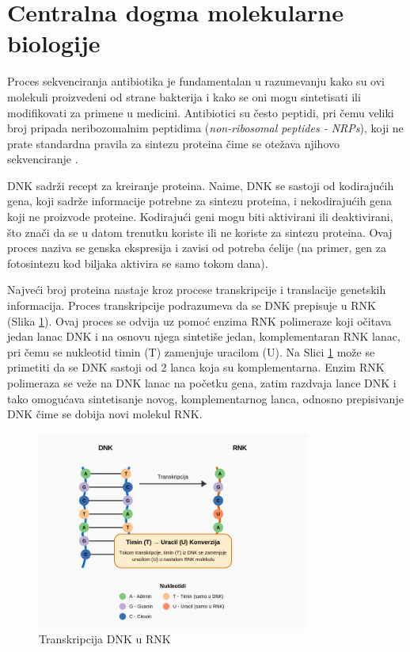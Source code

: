 \documentclass[12pt,oneside]{memoir}
\begin{document}
\section{Centralna dogma molekularne biologije}
Proces sekvenciranja antibiotika je fundamentalan u razumevanju kako su ovi molekuli proizvedeni od strane bakterija i kako se oni mogu sintetisati ili modifikovati za primene u medicini. Antibiotici su često peptidi, pri čemu veliki broj pripada neribozomalnim peptidima (\emph{non-ribosomal peptides - NRPs}), koji ne prate standardna pravila za sintezu proteina čime se otežava njihovo sekvenciranje \cite{online_lecture, online_book}.

DNK sadrži recept za kreiranje proteina. Naime, DNK se sastoji od kodirajućih gena, koji sadrže informacije potrebne za sintezu proteina, i nekodirajućih gena koji ne proizvode proteine. Kodirajući geni mogu biti aktivirani ili deaktivirani, što znači da se u datom trenutku koriste ili ne koriste za sintezu proteina. Ovaj proces naziva se genska ekspresija i zavisi od potreba ćelije (na primer, gen za fotosintezu kod biljaka aktivira se samo tokom dana).

Najveći broj proteina nastaje kroz procese transkripcije i translacije genetskih informacija. 
Proces transkripcije podrazumeva da se DNK prepisuje u RNK (Slika \ref{fig:transkripcija}). Ovaj proces se odvija uz pomoć enzima RNK polimeraze koji očitava jedan lanac DNK i na osnovu njega sintetiše jedan, komplementaran RNK lanac, pri čemu se nukleotid timin (T) zamenjuje uracilom (U). Na Slici \ref{fig:transkripcija} može se primetiti da se DNK sastoji od 2 lanca koja su komplementarna. Enzim RNK polimeraza se veže na DNK lanac na početku gena, zatim razdvaja lance DNK i tako omogućava sintetisanje novog, komplementarnog lanca, odnosno prepisivanje DNK čime se dobija novi molekul RNK.

\begin{figure}[h]
  \centering
  \includegraphics[width=0.8\textwidth]{images/dna_rna_transcription_diagram.png}
  \caption{Transkripcija DNK u RNK}
  \label{fig:transkripcija}
\end{figure}
\end{document}
